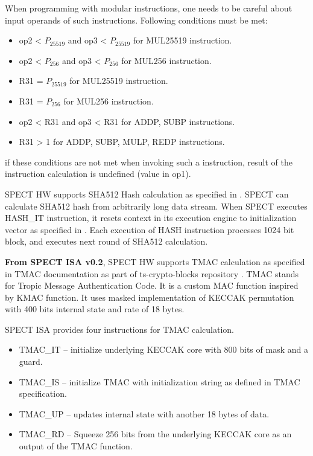 \documentclass[notconfidential]{tropic_design_spec}
\begin{document}
When programming with modular instructions, one needs to be careful about input
operands of such instructions. Following conditions must be met:
\begin{itemize}
    \item op2 < $P_{25519}$ and op3 < $P_{25519}$ for MUL25519 instruction.
    \item op2 < $P_{256}$ and op3 < $P_{256}$ for MUL256 instruction.
    \item R31 = $P_{25519}$ for MUL25519 instruction.
    \item R31 = $P_{256}$ for MUL256 instruction.
    \item op2 < R31 and op3 < R31 for ADDP, SUBP instructions.
    \item R31 > 1 for ADDP, SUBP, MULP, REDP instructions.
\end{itemize}
if these conditions are not met when invoking such a instruction, result
of the instruction calculation is undefined (value in op1).



SPECT HW supports SHA512 Hash calculation as specified in \cite{SHA512SPEC}. SPECT can
calculate SHA512 hash from arbitrarily long data stream. When SPECT executes HASH_IT
instruction, it resets context in its execution engine to initialization
vector as specified in \cite{SHA512SPEC}. Each execution of HASH instruction
processes 1024 bit block, and executes next round of SHA512 calculation.



\textbf{From SPECT ISA v0.2}, SPECT HW supports TMAC calculation as specified in TMAC documentation as part of ts-crypto-blocks repository \cite{CRYPTOBLOCKS}.
TMAC stands for Tropic Message Authentication Code. It is a custom MAC function inspired by KMAC function. It uses masked implementation
of KECCAK permutation with 400 bits internal state and rate of 18 bytes.

SPECT ISA provides four instructions for TMAC calculation.
\begin{itemize}
    \item TMAC_IT -- initialize underlying KECCAK core with 800 bits of mask and a guard.
    \item TMAC_IS -- initialize TMAC with initialization string as defined in TMAC specification.
    \item TMAC_UP -- updates internal state with another 18 bytes of data.
    \item TMAC_RD -- Squeeze 256 bits from the underlying KECCAK core as an output of the TMAC function.
\end{itemize}
\end{document}
